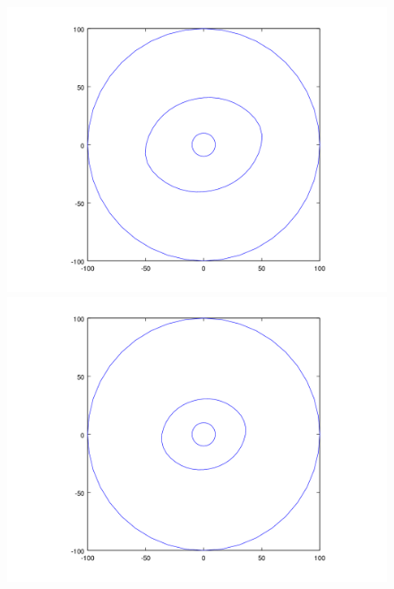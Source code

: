 \begin{figure}[H]
\centering
\begin{minipage}{0.48\textwidth}
  \centering
    \includegraphics[width=1\textwidth]{imgs/comp_rads_bueno/comp_radss_iso5.png}
  \caption{}
  \label{fig:Radios1}
\end{minipage}%
\hspace{0.03\textwidth}
\begin{minipage}{0.48\textwidth}   
  \centering
    \includegraphics[width=1\textwidth]{imgs/comp_rads_bueno/comp_radss_iso0.png} 
    \caption{} 
  \label{fig:Radios2}
\end{minipage}
\end{figure}


